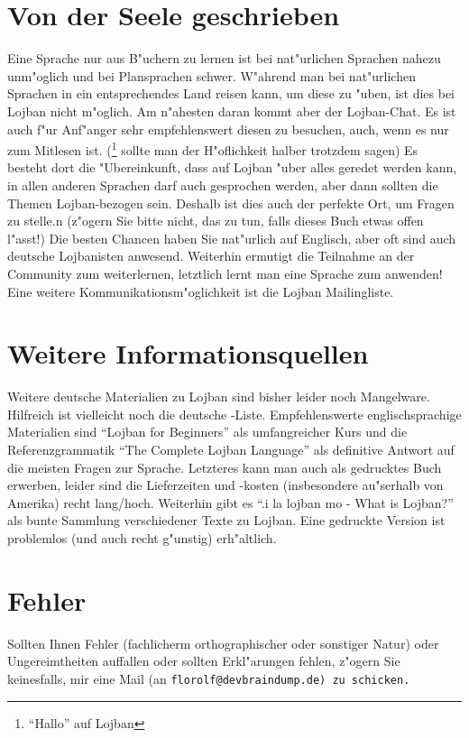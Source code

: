 \section{Von der Seele geschrieben}
Eine Sprache nur aus B"uchern zu lernen ist bei nat"urlichen Sprachen nahezu unm"oglich und bei Plansprachen schwer. W"ahrend
man bei nat"urlichen Sprachen in ein entsprechendes Land reisen kann, um diese zu "uben, ist dies bei Lojban nicht m"oglich.
Am n"ahesten daran kommt aber der Lojban-Chat. Es ist auch f"ur Anf"anger sehr empfehlenswert diesen zu besuchen, auch, wenn es nur zum Mitlesen ist. (\footnote{``Hallo'' auf Lojban} sollte man der H"oflichkeit halber trotzdem sagen)
Es besteht dort die "Ubereinkunft, dass auf Lojban "uber alles geredet werden kann, in allen anderen Sprachen darf auch gesprochen werden,
aber dann sollten die Themen Lojban-bezogen sein. Deshalb ist dies auch der perfekte Ort, um Fragen zu stelle.n (z"ogern Sie bitte nicht, das zu tun, falls dieses Buch etwas offen l"asst!)
Die besten Chancen haben Sie nat"urlich auf Englisch, aber oft sind auch deutsche Lojbanisten anwesend.
Weiterhin ermutigt die Teilnahme an der Community zum weiterlernen, letztlich lernt man eine Sprache zum anwenden!
Eine weitere Kommunikationsm"oglichkeit ist die Lojban Mailingliste.

\section{Weitere Informationsquellen}
Weitere deutsche Materialien zu Lojban sind bisher leider noch Mangelware. Hilfreich ist vielleicht noch die deutsche -Liste.
Empfehlenswerte englischsprachige Materialien sind ``Lojban for Beginners'' als umfangreicher Kurs und die Referenzgrammatik ``The Complete Lojban Language'' als definitive Antwort
auf die meisten Fragen zur Sprache. Letzteres kann man auch als gedrucktes Buch erwerben, leider sind die Lieferzeiten und -kosten (insbesondere au"serhalb von Amerika) recht lang/hoch.
Weiterhin gibt es ``.i la lojban mo - What is Lojban?'' als bunte Sammlung verschiedener Texte zu Lojban. Eine gedruckte Version ist problemlos (und auch recht g"unstig) erh"altlich.

\section{Fehler}
Sollten Ihnen Fehler (fachlicherm orthographischer oder sonstiger Natur) oder Ungereimtheiten auffallen oder sollten
Erkl"arungen fehlen, z"ogern Sie keinesfalls, mir eine Mail (an \tt{florolf@devbraindump.de}\rm{}) zu schicken.
